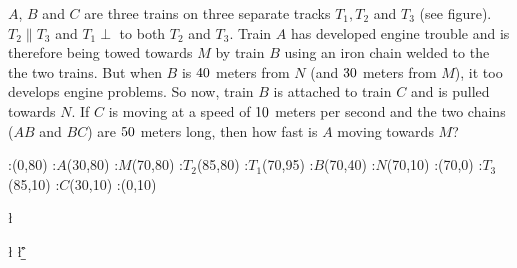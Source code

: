 


\question[4] $A$, $B$ and $C$ are three trains on three separate tracks $T_1, T_2$ and $T_3$ (see figure). 
$T_2\parallel T_3$ and $T_1\perp$ to both $T_2$ and $T_3$. Train $A$ has developed engine 
trouble and is therefore being towed towards $M$ by train $B$ using an iron chain welded to the 
the two trains. But when $B$ is $40$ meters from $N$ (and $30$ meters from $M$), it too
develops engine problems. So now, train $B$ is attached to train $C$ and is pulled towards $N$.
If $C$ is moving at a speed of $10$ meters per second and the two chains ($AB$ and $BC$)
are $50$ meters long, then how fast is $A$ moving towards $M$?

\watchout[-5cm]

\vspace{1cm}
  :(0,80) %
  :$A$(30,80)
  :$M$(70,80)
  :$T_2$(85,80)
  :$T_1$(70,95) %
  :$B$(70,40)
  :$N$(70,10)
  :(70,0)
  :$T_3$(85,10) %
  :$C$(30,10)
  :(0,10)
\figdrawbegin{}
  \figdrawline [100,101,102,103]
  \figdrawline [104,105,106,107]
  \figdrawline [108,109,110]
  \figdrawline [101,105,109]
\figdrawend
{}
\centerline{\box\figBoxA}

\ADD\va\vb\p

\POWER{}\l %
\POWER{}\bns
\POWER{}\bms

\SUBTRACT\l\bns\cn
\SUBTRACT\l\bms\am
\SQRT\cn\q
\SQRT\am\r

\FRACMULT\va\q\r\vb\a\b
\FRACMULT\b\a{}\e\f

